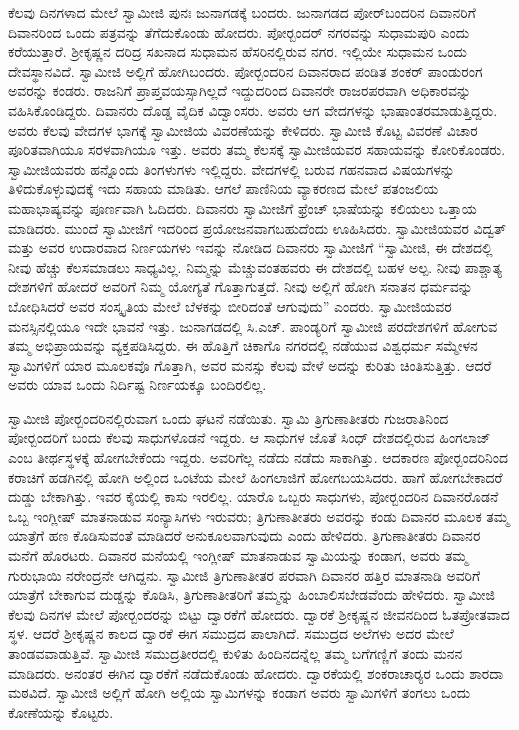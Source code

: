 ಕೆಲವು ದಿನಗಳಾದ ಮೇಲೆ ಸ್ವಾಮೀಜಿ ಪುನಃ ಜುನಾಗಡಕ್ಕೆ ಬಂದರು. ಜುನಾಗಡದ ಪೋರ್​‍ಬಂದರಿನ ದಿವಾನರಿಗೆ ದಿವಾನರಿಂದ ಒಂದು ಪತ್ರವನ್ನು ತೆಗೆದುಕೊಂಡು ಹೋದರು. ಪೋರ್‍ಬಂದರ್ ನಗರವನ್ನು ಸುಧಾಮಪುರಿ ಎಂದು ಕರೆಯುತ್ತಾರೆ. ಶ‍್ರೀಕೃಷ್ಣನ ದರಿದ್ರ ಸಖನಾದ ಸುಧಾಮನ ಹೆಸರಿನಲ್ಲಿರುವ ನಗರ. ಇಲ್ಲಿಯೇ ಸುಧಾಮನ ಒಂದು ದೇವಸ್ಥಾನವಿದೆ. ಸ್ವಾಮೀಜಿ ಅಲ್ಲಿಗೆ ಹೋಗಿಬಂದರು. ಪೋರ್‍ಬಂದರಿನ ದಿವಾನರಾದ ಪಂಡಿತ ಶಂಕರ್ ಪಾಂಡುರಂಗ ಅವರನ್ನು ಕಂಡರು. ರಾಜನಿಗೆ ಪ್ರಾಪ್ತವಯಸ್ಸಾಗಿಲ್ಲದೆ ಇದ್ದುದರಿಂದ ದಿವಾನರೇ ರಾಜರಪರವಾಗಿ ಅಧಿಕಾರವನ್ನು ವಹಿಸಿಕೊಂಡಿದ್ದರು. ದಿವಾನರು ದೊಡ್ಡ ವೈದಿಕ ವಿದ್ವಾಂಸರು. ಅವರು ಆಗ ವೇದಗಳನ್ನು ಭಾಷಾಂತರಮಾಡುತ್ತಿದ್ದರು. ಅವರು ಕೆಲವು ವೇದಗಳ ಭಾಗಕ್ಕೆ ಸ್ವಾಮೀಜಿಯ ವಿವರಣೆಯನ್ನು ಕೇಳಿದರು. ಸ್ವಾಮೀಜಿ ಕೊಟ್ಟ ವಿವರಣೆ ವಿಚಾರ ಪೂರಿತವಾಗಿಯೂ ಸರಳವಾಗಿಯೂ ಇತ್ತು. ಅವರು ತಮ್ಮ ಕೆಲಸಕ್ಕೆ ಸ್ವಾಮೀಜಿಯವರ ಸಹಾಯವನ್ನು ಕೋರಿಕೊಂಡರು. ಸ್ವಾಮೀಜಿಯವರು ಹನ್ನೊಂದು ತಿಂಗಳುಗಳು ಇಲ್ಲಿದ್ದರು. ವೇದಗಳಲ್ಲಿ ಬರುವ ಗಹನವಾದ ವಿಷಯಗಳನ್ನು ತಿಳಿದುಕೊಳ್ಳುವುದಕ್ಕೆ ಇದು ಸಹಾಯ ಮಾಡಿತು. ಆಗಲೆ ಪಾಣಿನಿಯ ವ್ಯಾಕರಣದ ಮೇಲೆ ಪತಂಜಲಿಯ ಮಹಾಭಾಷ್ಯವನ್ನು ಪೂರ್ಣವಾಗಿ ಓದಿದರು. ದಿವಾನರು ಸ್ವಾಮೀಜಿಗೆ ಫ್ರೆಂಚ್ ಭಾಷೆಯನ್ನು ಕಲಿಯಲು ಒತ್ತಾಯ ಮಾಡಿದರು. ಮುಂದೆ ಸ್ವಾಮೀಜಿಗೆ ಇದರಿಂದ ಪ್ರಯೋಜನವಾಗಬಹುದೆಂದು ಊಹಿಸಿದರು. ಸ್ವಾಮೀಜಿಯವರ ವಿದ್ವತ್ ಮತ್ತು ಅವರ ಉದಾರವಾದ ನಿರ್ಣಯಗಳು ಇವನ್ನು ನೋಡಿದ ದಿವಾನರು ಸ್ವಾಮೀಜಿಗೆ “ಸ್ವಾಮೀಜಿ, ಈ ದೇಶದಲ್ಲಿ ನೀವು ಹೆಚ್ಚು ಕೆಲಸಮಾಡಲು ಸಾಧ್ಯವಿಲ್ಲ. ನಿಮ್ಮನ್ನು ಮೆಚ್ಚುವಂತಹವರು ಈ ದೇಶದಲ್ಲಿ ಬಹಳ ಅಲ್ಪ. ನೀವು ಪಾಶ್ಚಾತ್ಯ ದೇಶಗಳಿಗೆ ಹೋದರೆ ಅವರಿಗೆ ನಿಮ್ಮ ಯೋಗ್ಯತೆ ಗೊತ್ತಾಗುತ್ತದೆ. ನೀವು ಅಲ್ಲಿಗೆ ಹೋಗಿ ಸನಾತನ ಧರ್ಮವನ್ನು ಬೋಧಿಸಿದರೆ ಅವರ ಸಂಸ್ಕೃತಿಯ ಮೇಲೆ ಬೆಳಕನ್ನು ಬೀರಿದಂತೆ ಆಗುವುದು” ಎಂದರು. ಸ್ವಾಮೀಜಿಯವರ ಮನಸ್ಸಿನಲ್ಲಿಯೂ ಇದೇ ಭಾವನೆ ಇತ್ತು. ಜುನಾಗಡದಲ್ಲಿ ಸಿ.ಎಚ್. ಪಾಂಡ್ಯರಿಗೆ ಸ್ವಾಮೀಜಿ ಪರದೇಶಗಳಿಗೆ ಹೋಗುವ ತಮ್ಮ ಅಭಿಪ್ರಾಯವನ್ನು ವ್ಯಕ್ತಪಡಿಸಿದ್ದರು. ಈ ಹೊತ್ತಿಗೆ ಚಿಕಾಗೊ ನಗರದಲ್ಲಿ ನಡೆಯುವ ವಿಶ್ವಧರ್ಮ ಸಮ್ಮೇಳನ ಸ್ವಾಮಿಗಳಿಗೆ ಯಾರ ಮೂಲಕವೊ ಗೊತ್ತಾಗಿ, ಅವರ ಮನಸ್ಸು ಕೆಲವು ವೇಳೆ ಅದನ್ನು ಕುರಿತು ಚಿಂತಿಸುತ್ತಿತ್ತು. ಆದರೆ ಅವರು ಯಾವ ಒಂದು ನಿರ್ದಿಷ್ಟ ನಿರ್ಣಯಕ್ಕೂ ಬಂದಿರಲಿಲ್ಲ.

ಸ್ವಾಮೀಜಿ ಪೋರ್‍ಬಂದರಿನಲ್ಲಿರುವಾಗ ಒಂದು ಘಟನೆ ನಡೆಯಿತು. ಸ್ವಾಮಿ ತ್ರಿಗುಣಾತೀತರು ಗುಜರಾತಿನಿಂದ ಪೋರ್‍ಬಂದರಿಗೆ ಬಂದು ಕೆಲವು ಸಾಧುಗಳೊಡನೆ ಇದ್ದರು. ಆ ಸಾಧುಗಳ ಜೊತೆ ಸಿಂಧ್ ದೇಶದಲ್ಲಿರುವ ಹಿಂಗಲಾಜ್ ಎಂಬ ತೀರ್ಥಸ್ಥಳಕ್ಕೆ ಹೋಗಬೇಕೆಂದು ಇದ್ದರು. ಅವರಿಗೆಲ್ಲ ನಡೆದು ನಡೆದು ಸಾಕಾಗಿತ್ತು. ಆದಕಾರಣ ಪೋರ್‍ಬಂದರಿನಿಂದ ಕರಾಚಿಗೆ ಹಡಗಿನಲ್ಲಿ ಹೋಗಿ ಅಲ್ಲಿಂದ ಒಂಟೆಯ ಮೇಲೆ ಹಿಂಗಲಾಜಿಗೆ ಹೋಗಬಯಸಿದರು. ಹಾಗೆ ಹೋಗಬೇಕಾದರೆ ದುಡ್ಡು ಬೇಕಾಗಿತ್ತು. ಇವರ ಕೈಯಲ್ಲಿ ಕಾಸು ಇರಲಿಲ್ಲ. ಯಾರೊ ಒಬ್ಬರು ಸಾಧುಗಳು, ಪೋರ್‍ಬಂದರಿನ ದಿವಾನರೊಡನೆ ಒಬ್ಬ ಇಂಗ್ಲೀಷ್ ಮಾತನಾಡುವ ಸಂನ್ಯಾಸಿಗಳು ಇರುವರು; ತ್ರಿಗುಣಾತೀತರು ಅವರನ್ನು ಕಂಡು ದಿವಾನರ ಮೂಲಕ ತಮ್ಮ ಯಾತ್ರೆಗೆ ಹಣ ಕೊಡಿಸುವಂತೆ ಮಾಡಿದರೆ ಅನುಕೂಲವಾಗುವುದು ಎಂದು ಹೇಳಿದರು. ತ್ರಿಗುಣಾತೀತರು ದಿವಾನರ ಮನೆಗೆ ಹೊರಟರು. ದಿವಾನರ ಮನೆಯಲ್ಲಿ ಇಂಗ್ಲೀಷ್ ಮಾತನಾಡುವ ಸ್ವಾಮಿಯನ್ನು ಕಂಡಾಗ, ಅವರು ತಮ್ಮ ಗುರುಭಾಯಿ ನರೇಂದ್ರನೇ ಆಗಿದ್ದನು. ಸ್ವಾಮೀಜಿ ತ್ರಿಗುಣಾತೀತರ ಪರವಾಗಿ ದಿವಾನರ ಹತ್ತಿರ ಮಾತನಾಡಿ ಅವರಿಗೆ ಯಾತ್ರೆಗೆ ಬೇಕಾಗುವ ದುಡ್ಡನ್ನು ಕೊಡಿಸಿ, ತ್ರಿಗುಣಾತೀತರಿಗೆ ತಮ್ಮನ್ನು ಹಿಂಬಾಲಿಸಬೇಡವೆಂದು ಹೇಳಿದರು. ಸ್ವಾಮೀಜಿ ಕೆಲವು ದಿನಗಳ ಮೇಲೆ ಪೋರ್‍ಬಂದರನ್ನು ಬಿಟ್ಟು ದ್ವಾರಕೆಗೆ ಹೋದರು. ದ್ವಾರಕೆ ಶ‍್ರೀಕೃಷ್ಣನ ಜೀವನದಿಂದ ಓತಪ್ರೋತವಾದ ಸ್ಥಳ. ಆದರೆ ಶ‍್ರೀಕೃಷ್ಣನ ಕಾಲದ ದ್ವಾರಕೆ ಈಗ ಸಮುದ್ರದ ಪಾಲಾಗಿದೆ. ಸಮುದ್ರದ ಅಲೆಗಳು ಅದರ ಮೇಲೆ ತಾಂಡವವಾಡುತ್ತಿವೆ. ಸ್ವಾಮೀಜಿ ಸಮುದ್ರತೀರದಲ್ಲಿ ಕುಳಿತು ಹಿಂದಿನದನ್ನೆಲ್ಲ ತಮ್ಮ ಬಗೆಗಣ್ಣಿಗೆ ತಂದು ಮನನ ಮಾಡಿದರು. ಅನಂತರ ಈಗಿನ ದ್ವಾರಕೆಗೆ ನಡೆದುಕೊಂಡು ಹೋದರು. ದ್ವಾರಕೆಯಲ್ಲಿ ಶಂಕರಾಚಾರ‍್ಯರ ಒಂದು ಶಾರದಾ ಮಠವಿದೆ. ಸ್ವಾಮೀಜಿ ಅಲ್ಲಿಗೆ ಹೋಗಿ ಅಲ್ಲಿಯ ಸ್ವಾಮಿಗಳನ್ನು ಕಂಡಾಗ ಅವರು ಸ್ವಾಮಿಗಳಿಗೆ ತಂಗಲು ಒಂದು ಕೋಣೆಯನ್ನು ಕೊಟ್ಟರು.

